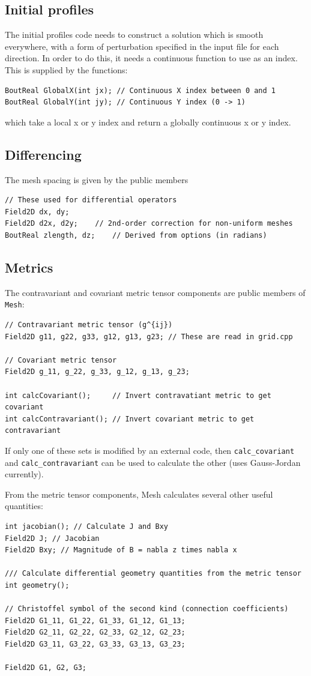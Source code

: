 \documentclass[12pt]{article}
\newcommand{\code}[1]{\texttt{#1}}
\begin{document}
\subsection{Initial profiles}
The initial profiles code needs to construct a solution which is smooth
everywhere, with a form of perturbation specified in the input file
for each direction. In order to do this, it needs a continuous function
to use as an index. This is supplied by the functions:
\begin{lstlisting}
BoutReal GlobalX(int jx); // Continuous X index between 0 and 1
BoutReal GlobalY(int jy); // Continuous Y index (0 -> 1)
\end{lstlisting}
which take a local x or y index and return a globally continuous x or y
index.

\subsection{Differencing}

The mesh spacing is given by the public members
\begin{lstlisting}
// These used for differential operators 
Field2D dx, dy;
Field2D d2x, d2y;    // 2nd-order correction for non-uniform meshes		
BoutReal zlength, dz;    // Derived from options (in radians)
\end{lstlisting}

\subsection{Metrics}
The contravariant and covariant metric tensor components are
public members of \code{Mesh}: 
\begin{lstlisting}
// Contravariant metric tensor (g^{ij})
Field2D g11, g22, g33, g12, g13, g23; // These are read in grid.cpp

// Covariant metric tensor
Field2D g_11, g_22, g_33, g_12, g_13, g_23;

int calcCovariant();     // Invert contravatiant metric to get covariant
int calcContravariant(); // Invert covariant metric to get contravariant
\end{lstlisting}
If only one of these sets is modified by an external code, then
\code{calc\_covariant} and \code{calc\_contravariant} can be used
to calculate the other (uses Gauss-Jordan currently).

From the metric tensor components, Mesh calculates several other useful
quantities:
\begin{lstlisting}
int jacobian(); // Calculate J and Bxy
Field2D J; // Jacobian
Field2D Bxy; // Magnitude of B = nabla z times nabla x

/// Calculate differential geometry quantities from the metric tensor
int geometry();

// Christoffel symbol of the second kind (connection coefficients)
Field2D G1_11, G1_22, G1_33, G1_12, G1_13;
Field2D G2_11, G2_22, G2_33, G2_12, G2_23;
Field2D G3_11, G3_22, G3_33, G3_13, G3_23;
  
Field2D G1, G2, G3;
\end{lstlisting}
\end{document}
